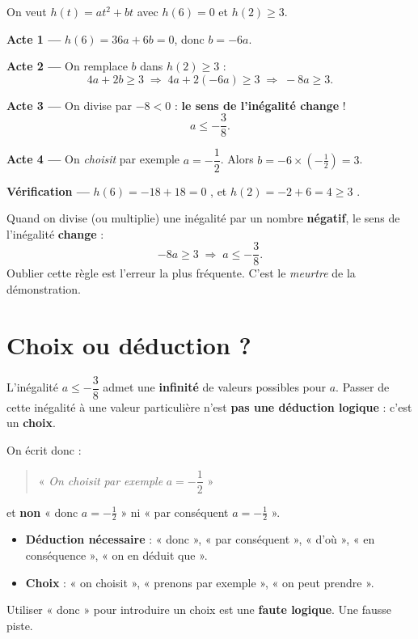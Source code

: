 \documentclass[11pt,a4paper]{article}
\begin{document}
\begin{rapport}
On veut $h(t) = at^2+bt$ avec $h(6) = 0$ et $h(2) \geq 3$.

\textbf{Acte 1 —} $h(6) = 36a + 6b = 0$, donc $b = -6a$.

\textbf{Acte 2 —} On remplace $b$ dans $h(2) \geq 3$ :
\[
  4a + 2b \geq 3 \;\Longrightarrow\; 4a + 2(-6a) \geq 3 \;\Longrightarrow\; -8a \geq 3.
\]

\textbf{Acte 3 —} On divise par $-8 < 0$ : \textbf{le sens de l'inégalité change} !
\[
  a \leq -\frac{3}{8}.
\]

\textbf{Acte 4 —} On \emph{choisit} par exemple $a = -\dfrac{1}{2}$. Alors $b = -6 \times (-\frac{1}{2}) = 3$.

\textbf{Vérification —} $h(6) = -18 + 18 = 0$ \checkmark, et $h(2) = -2 + 6 = 4 \geq 3$ \checkmark.
\end{rapport}

\begin{alerte}
Quand on divise (ou multiplie) une inégalité par un nombre \textbf{négatif}, le sens de l'inégalité \textbf{change} :
\[
  -8a \geq 3 \;\Longrightarrow\; a \leq -\frac{3}{8}.
\]
Oublier cette règle est l'erreur la plus fréquente. C'est le \emph{meurtre} de la démonstration.
\end{alerte}

\section{Choix ou déduction ?}

\begin{indice}
L'inégalité $a \leq -\dfrac{3}{8}$ admet une \textbf{infinité} de valeurs possibles pour $a$. Passer de cette inégalité à une valeur particulière n'est \textbf{pas une déduction logique} : c'est un \textbf{choix}.

On écrit donc :
\begin{quote}
  « \emph{On choisit par exemple} $a = -\dfrac{1}{2}$ »
\end{quote}
et \textbf{non} « donc $a = -\frac{1}{2}$ » ni « par conséquent $a = -\frac{1}{2}$ ».
\end{indice}

\begin{methode}
\begin{itemize}[leftmargin=*]
  \item \textbf{Déduction nécessaire} : « donc », « par conséquent », « d'où », « en conséquence », « on en déduit que ».
  \item \textbf{Choix} : « on choisit », « prenons par exemple », « on peut prendre ».
\end{itemize}
Utiliser « donc » pour introduire un choix est une \textbf{faute logique}. Une fausse piste.
\end{methode}
\end{document}
